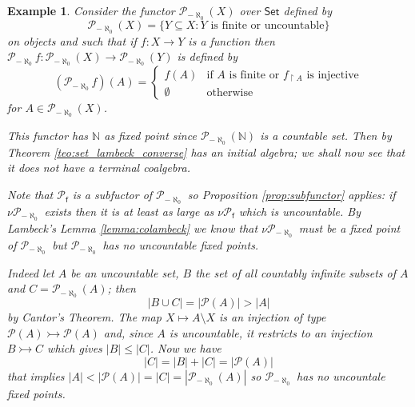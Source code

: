 \documentclass[letterpaper, 11pt, oneside]{memoir}
\theoremstyle{myteo}
\newtheorem{example}[theorem]{Example}
\numberwithin{equation}{section}
\newcommand{\Set}{\textsf{Set}}
\begin{document}
\begin{example}
  \label{ex:coalgebra-bad}
  Consider the functor \(\mathcal{P}_{-\aleph_0}(X)\) over \(\Set\) defined by
  \begin{equation*}
    \mathcal{P}_{-\aleph_0}(X) = \{Y \subseteq X : \text{\(Y\) is finite or uncountable}\}
  \end{equation*}
  on objects and such that if \(f: X \to Y\) is a function then \(\mathcal{P}_{-\aleph_0}f: \mathcal{P}_{-\aleph_0}(X) \to \mathcal{P}_{-\aleph_0}(Y)\) is defined by
  \begin{equation*}
    (\mathcal{P}_{-\aleph_0}f)(A) = 
    \begin{cases}
      f(A) & \text{if \(A\) is finite or \(f_{\upharpoonright A}\) is injective}\\
      \emptyset & \text{otherwise}
    \end{cases}
  \end{equation*}
  for \(A \in \mathcal{P}_{-\aleph_0}(X)\).

  This functor has \(\mathbb{N}\) as fixed point since \(\mathcal{P}_{-\aleph_0}(\mathbb{N})\) is a countable set.
  Then by Theorem \ref{teo:set_lambeck_converse} has an initial algebra; we shall now see that it does not have a terminal coalgebra.

  Note that \(\mathcal{P}_\textsf{f}\) is a subfuctor of \(\mathcal{P}_{-\aleph_0}\) so Proposition \ref{prop:subfunctor} applies: if \(\nu \mathcal{P}_{-\aleph_0}\) exists then it is at least as large as \(\nu \mathcal{P}_{\textsf{f}}\) which is uncountable.
  By Lambeck's Lemma \ref{lemma:colambeck} we know that \(\nu\mathcal{P}_{-\aleph_0}\) must be a fixed point of \(\mathcal{P}_{-\aleph_0}\) but \(\mathcal{P}_{-\aleph_0}\) has no uncountable fixed points.
  
  Indeed let \(A\) be an uncountable set, \(B\) the set of all countably infinite subsets of \(A\) and \(C = \mathcal{P}_{-\aleph_0}(A)\); then
  \begin{equation*}
    |B \cup C| = |\mathcal{P}(A)| > |A|
  \end{equation*}
  by Cantor's Theorem.
  The map \(X \mapsto A \setminus X\) is an injection of type \(\mathcal{P}(A) \rightarrowtail \mathcal{P}(A)\) and, since \(A\) is uncountable, it restricts to an injection \(B \rightarrowtail C\) which gives \(|B| \leq |C|\).
  Now we have
  \begin{equation*}
    |C| = |B| + |C| = |\mathcal{P}(A)|
  \end{equation*}
  that implies \(|A| < |\mathcal{P}(A)| = |C| = |\mathcal{P}_{-\aleph_0}(A)|\) so \(\mathcal{P}_{-\aleph_0}\) has no uncountale fixed points.
\end{example}
\end{document}
